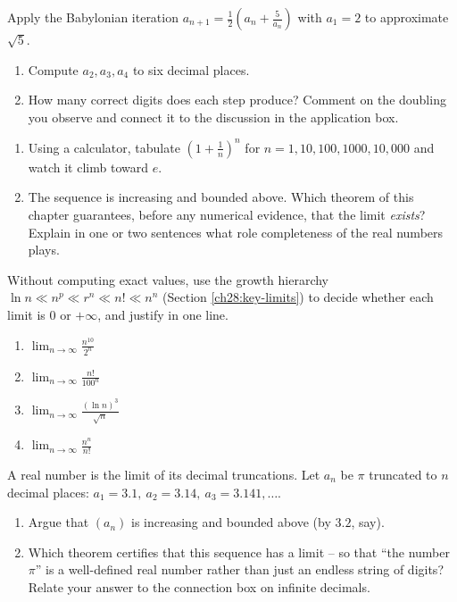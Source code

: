 \begin{exercise}
\label{ch28:exr-babylonian}
Apply the Babylonian iteration $a_{n+1} = \tfrac12(a_n + \tfrac{5}{a_n})$ with
$a_1 = 2$ to approximate $\sqrt5$.
\begin{enumerate}[label=(\alph*)]
  \item Compute $a_2, a_3, a_4$ to six decimal places.
  \item How many correct digits does each step produce? Comment on the doubling
        you observe and connect it to the discussion in the application box.
\end{enumerate}
\end{exercise}

\begin{exercise}
\label{ch28:exr-e}
\begin{enumerate}[label=(\alph*)]
  \item Using a calculator, tabulate $(1 + \tfrac1n)^n$ for $n = 1, 10, 100,
        1000, 10{,}000$ and watch it climb toward $e$.
  \item The sequence is increasing and bounded above. Which theorem of this
        chapter guarantees, before any numerical evidence, that the limit
        \emph{exists}? Explain in one or two sentences what role completeness of
        the real numbers plays.
\end{enumerate}
\end{exercise}

\begin{exercise}
\label{ch28:exr-growth-ladder}
Without computing exact values, use the growth hierarchy $\ln n \ll n^p \ll r^n
\ll n! \ll n^n$ (Section \ref{ch28:key-limits}) to decide whether each limit is
$0$ or $+\infty$, and justify in one line.
\begin{enumerate}[label=(\alph*)]
  \item $\displaystyle\lim_{n\to\infty} \frac{n^{10}}{2^n}$
  \item $\displaystyle\lim_{n\to\infty} \frac{n!}{100^n}$
  \item $\displaystyle\lim_{n\to\infty} \frac{(\ln n)^3}{\sqrt n}$
  \item $\displaystyle\lim_{n\to\infty} \frac{n^n}{n!}$
\end{enumerate}
\end{exercise}

\begin{exercise}
\label{ch28:exr-decimals}
A real number is the limit of its decimal truncations. Let $a_n$ be $\pi$
truncated to $n$ decimal places: $a_1 = 3.1,\ a_2 = 3.14,\ a_3 = 3.141, \dots$.
\begin{enumerate}[label=(\alph*)]
  \item Argue that $(a_n)$ is increasing and bounded above (by $3.2$, say).
  \item Which theorem certifies that this sequence has a limit -- so that ``the
        number $\pi$'' is a well-defined real number rather than just an endless
        string of digits? Relate your answer to the connection box on infinite
        decimals.
\end{enumerate}
\end{exercise}
